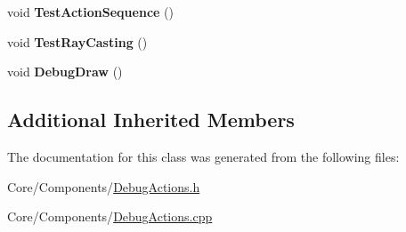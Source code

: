 \begin{DoxyCompactItemize}
\item 
\hypertarget{classDCEngine_1_1Components_1_1DebugActions_a6e6ae2fd56684a19f5d5c999a8e08c14}{void {\bfseries Test\-Action\-Sequence} ()}\label{classDCEngine_1_1Components_1_1DebugActions_a6e6ae2fd56684a19f5d5c999a8e08c14}

\item 
\hypertarget{classDCEngine_1_1Components_1_1DebugActions_a6c0a2183af7077931fb9e9e8883cf2c0}{void {\bfseries Test\-Ray\-Casting} ()}\label{classDCEngine_1_1Components_1_1DebugActions_a6c0a2183af7077931fb9e9e8883cf2c0}

\item 
\hypertarget{classDCEngine_1_1Components_1_1DebugActions_a3abfc0f7d9b76ac363b31f74e106892a}{void {\bfseries Debug\-Draw} ()}\label{classDCEngine_1_1Components_1_1DebugActions_a3abfc0f7d9b76ac363b31f74e106892a}

\end{DoxyCompactItemize}
\subsection*{Additional Inherited Members}


The documentation for this class was generated from the following files\-:\begin{DoxyCompactItemize}
\item 
Core/\-Components/\hyperlink{DebugActions_8h}{Debug\-Actions.\-h}\item 
Core/\-Components/\hyperlink{DebugActions_8cpp}{Debug\-Actions.\-cpp}\end{DoxyCompactItemize}
